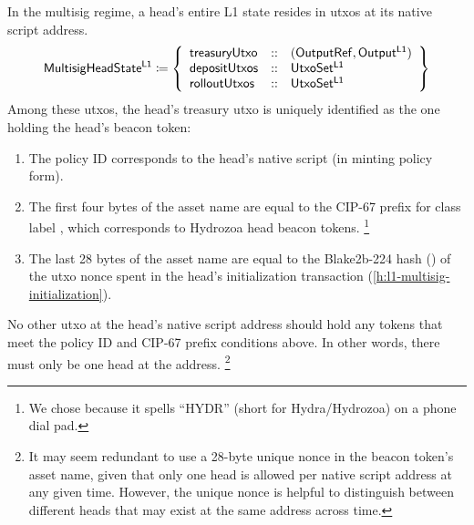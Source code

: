 \documentclass[../hydrozoa.tex]{subfiles}
\begin{document}
In the multisig regime, a head's entire L1 state resides in utxos at its native script address.
\begin{equation*}
  \mathsf{MultisigHeadState^{L1}} \coloneq \left\{
  \begin{array}{lll}
    \mathsf{treasuryUtxo} &::& (\mathsf{OutputRef}, \mathsf{Output^{L1}}) \\
    \mathsf{depositUtxos} &::& \mathsf{UtxoSet^{L1}} \\
    \mathsf{rolloutUtxos} &::& \mathsf{UtxoSet^{L1}}
  \end{array}\right\}
\end{equation*}
Among these utxos, the head's treasury utxo is uniquely identified as the one holding the head's beacon token:
\begin{enumerate}
  \item The policy ID corresponds to the head's native script (in minting policy form).
  \item The first four bytes of the asset name are equal to the CIP-67
    \citep{AlessandroKonradThomasVellekoopCIP67AssetName2022}
    prefix for class label \headBeaconToken{}, which corresponds to Hydrozoa head beacon tokens.%
    \footnote{We chose \headBeaconToken{} because it spells ``HYDR'' (short for Hydra/Hydrozoa) on a phone dial pad.}
  \item The last 28 bytes of the asset name are equal to the Blake2b-224 hash () of the utxo nonce spent in the head's initialization transaction (\cref{h:l1-multisig-initialization}).
\end{enumerate}
No other utxo at the head's native script address should hold any tokens that meet the policy ID and CIP-67 prefix conditions above.
In other words, there must only be one head at the address.%
\footnote{It may seem redundant to use a 28-byte unique nonce in the beacon token's asset name, given that only one head is allowed per native script address at any given time.
  However, the unique nonce is helpful to distinguish between different heads that may exist at the same address across time.}
\end{document}
